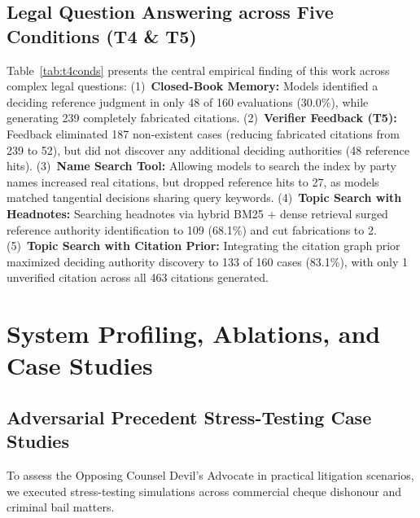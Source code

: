 \documentclass[conference]{IEEEtran}
\begin{document}
\subsection{Legal Question Answering across Five Conditions (T4 \& T5)}
Table~\ref{tab:t4conds} presents the central empirical finding of this work across \NumTopics{} complex legal questions:
(1)~\textbf{Closed-Book Memory:} Models identified a deciding reference judgment in only 48 of 160 evaluations (30.0\%), while generating 239 completely fabricated citations.
(2)~\textbf{Verifier Feedback (T5):} Feedback eliminated 187 non-existent cases (reducing fabricated citations from 239 to 52), but did not discover any additional deciding authorities (48 reference hits).
(3)~\textbf{Name Search Tool:} Allowing models to search the index by party names increased real citations, but dropped reference hits to 27, as models matched tangential decisions sharing query keywords.
(4)~\textbf{Topic Search with Headnotes:} Searching headnotes via hybrid BM25 + dense retrieval surged reference authority identification to 109 (68.1\%) and cut fabrications to 2.
(5)~\textbf{Topic Search with Citation Prior:} Integrating the citation graph prior maximized deciding authority discovery to 133 of 160 cases (83.1\%), with only 1 unverified citation across all 463 citations generated.

\section{System Profiling, Ablations, and Case Studies}
\label{sec:profiling}

\subsection{Adversarial Precedent Stress-Testing Case Studies}
To assess the Opposing Counsel Devil's Advocate in practical litigation scenarios, we executed stress-testing simulations across commercial cheque dishonour and criminal bail matters.
\end{document}
